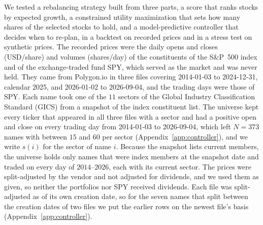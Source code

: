 
We tested a rebalancing strategy built from three parts, a score that ranks stocks by expected growth, a
constrained utility maximization that sets how many shares of the selected stocks to hold, and a
model-predictive controller that decides when to re-plan, in a backtest on recorded prices and in a stress test
on synthetic prices. The recorded prices were the daily opens and closes (USD/share) and volumes (shares/day) of
the constituents of the S\&P~500 index and of the exchange-traded fund SPY, which served as the market and was
never held. They came from Polygon.io in three files covering 2014-01-03 to 2024-12-31, calendar 2025, and
2026-01-02 to 2026-09-04, and the trading days were those of SPY. Each name took one of the $11$ sectors of the
Global Industry Classification Standard (GICS) from a snapshot of the index constituent list. The universe kept
every ticker that appeared in all three files with a sector and had a positive open and close on every trading
day from 2014-01-03 to 2026-09-04, which left $N = 373$ names with between $15$ and $60$ per sector
(Appendix~\ref{app:controller}), and we write $s(i)$ for the sector of name $i$. Because the snapshot lists current
members, the universe holds only names that were index members at the snapshot date and traded on every day of
$2014$--$2026$, each with its current sector. The prices were split-adjusted by the vendor and not adjusted for
dividends, and we used them as given, so neither the portfolios nor SPY received dividends. Each file was
split-adjusted as of its own creation date, so for the seven names that split between the creation dates of two
files we put the earlier rows on the newest file's basis (Appendix~\ref{app:controller}).

